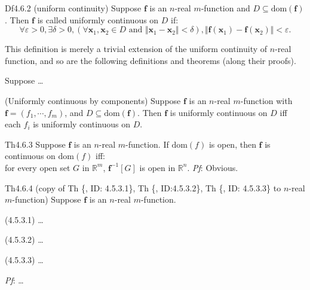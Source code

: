 \documentclass{article}
\begin{document}
\begin{Df}{Df4.6.2 (uniform continuity)}
    Suppose $\pmb{f}$ is an $n$-real $m$-function and $D\subseteq\text{dom}(\pmb{f})$. Then $\pmb{f}$ is called uniformly continuous on $D$ if:
    $$\forall\varepsilon>0, \exists\delta>0, \left(\forall \pmb{x}_1, \pmb{x}_2\in D\text{ and } \Vert\pmb{x}_1-\pmb{x}_2\Vert <\delta\right), \Vert\pmb{f}(\pmb{x}_1)-\pmb{f}(\pmb{x}_2)\Vert<\varepsilon.$$
\end{Df}

\begin{Rmk}{}
    This definition is merely a trivial extension of the uniform continuity of $n$-real function, and so are the following definitions and theorems (along their proofs).
    \begin{compactenum}
        \item \textcolor{Th}{Suppose \dots}
        \item \textcolor{Th}{(Uniformly continuous by components) Suppose $\pmb{f}$ is an $n$-real $m$-function with $\pmb{f} = (f_1, \cdots, f_m)$, and $D\subseteq\text{dom}(\pmb{f})$. Then $\pmb{f}$ is uniformly continuous on $D$ iff each $f_i$ is uniformly continuous on $D$.}
    \end{compactenum}
\end{Rmk}

\begin{Th}{Th4.6.3}
    Suppose $\pmb{f}$ is an $n$-real $m$-function. If $\text{dom}(f)$ is open, then $\pmb{f}$ is continuous on $\text{dom}(f)$ iff: \\
    for every open set $G$ in $\mathbb{R}^m$, $\pmb{f}^{-1}[G]$ is open in $\mathbb{R}^n$.
    \tcblower
    \textit{Pf}: Obvious.
\end{Th}

\begin{Th}{Th4.6.4 (copy of Th \{, ID: 4.5.3.1\}, Th \{, ID:4.5.3.2\}, Th \{, ID: 4.5.3.3\} to $n$-real $m$-function)}
    Suppose $\pmb{f}$ is an $n$-real $m$-function. 
    \begin{compactenum}
        \item (4.5.3.1) \dots
        \item (4.5.3.2) \dots
        \item (4.5.3.3) \dots
    \end{compactenum}
    \tcblower
    \textit{Pf}: \dots
\end{Th}
\end{document}
